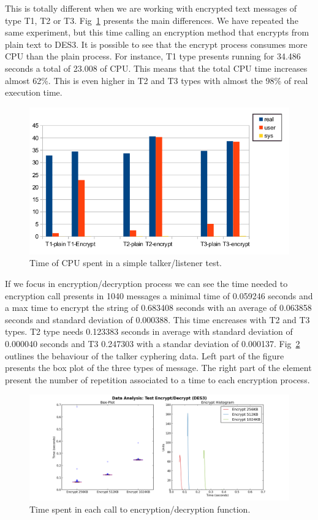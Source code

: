 \documentclass[journal,twoside]{JoPhA}
\begin{document}
This is totally different when we are working with encrypted text messages of type T1, T2 or T3. Fig~\ref{fig:time_text_CPU} presents the main differences. We have repeated the same experiment, but this time calling an encryption method that encrypts from plain text to DES3. It is possible to see that the encrypt process consumes more CPU than  the plain process.
For instance, T1 type presents running for  34.486 seconds a total of 23.008 of CPU. This means that the total CPU time increases almost 62\%. This is even higher in T2 and T3 types with almost the 98\% of real execution time.
\begin{figure}[ht!]
    \centering
    \includegraphics[width=.5\textwidth]{Tiempos_CPU_cifrado_texto.png}
    \caption{Time of CPU spent in a simple talker/listener test.}
  \label{fig:time_text_CPU}
\end{figure}

If we focus in encryption/decryption process we can see the time needed to encryption call presents in 1040 messages 
a minimal time of 0.059246 seconds and a  max time to encrypt the string of  0.683408 seconds with an average of 0.063858 seconds and standard deviation of 0.000388.
This time encreases with T2 and T3 types. T2 type needs 0.123383 seconds in average with standard deviation of 0.000040 seconds and  T3  0.247303 with a standar deviation of 0.000137.
Fig~\ref{fig:text_encryption_time} outlines the behaviour of the talker cyphering data. Left part of the figure presents the box plot of the three types of message. The right part of the element present the number of repetition associated to a time to each encryption process.
\begin{figure}[ht]
    \centering
    \includegraphics[width=.9\textwidth]{Outline_encryption_text.png}
    \caption{Time spent in each call to encryption/decryption function.}
  \label{fig:text_encryption_time}
\end{figure}
\end{document}
